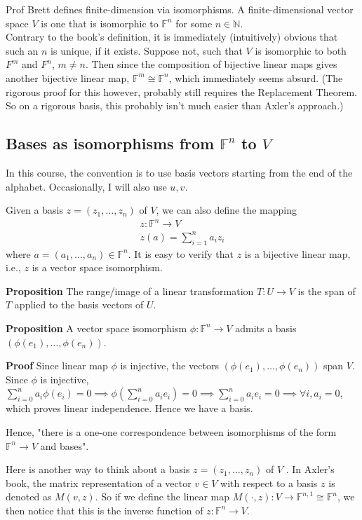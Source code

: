 \documentclass{article}
\begin{document}
Prof Brett defines finite-dimension via isomorphisms. A finite-dimensional vector space $V$ is one that is isomorphic to $\mathbb{F}^n$ for some $n\in \mathbb{N}$.\\
Contrary to the book's definition, it is immediately (intuitively) obvious that such an $n$ is unique, if it exists. Suppose not, such that $V$ is isomorphic to both $F^m$ and $F^n$, $m\neq n$. Then since the composition of bijective linear maps gives another bijective linear map, $\mathbb{F}^m\cong \mathbb{F}^n$, which immediately seems absurd. (The rigorous proof for this however, probably still requires the Replacement Theorem. So on a rigorous basis, this probably isn't much easier than Axler's approach.)


\subsection{Bases as isomorphisms from $\mathbb{F}^n$ to $V$}
In this course, the convention is to use basis vectors starting from the end of the alphabet. Occasionally, I will also use $u,v$.

Given a basis $z=(z_1,\dots,z_n)$ of $V$, we can also define the mapping 
\begin{align*}
z:\mathbb{F}^n\rightarrow V\\
z(a)=\sum_{i=1}^na_iz_i
\end{align*}
where $a=(a_1,\dots, a_n)\in \mathbb{F}^n$. It is easy to verify that $z$ is a bijective linear map, i.e., $z$ is a vector space isomorphism.

\textbf{Proposition} The range/image of a linear transformation $T:U\rightarrow V$ is the span of $T$ applied to the basis vectors of $U$.

\textbf{Proposition} A vector space isomorphism $\phi: \mathbb{F}^n\rightarrow V$ admits a basis $(\phi(e_1),\dots, \phi(e_n))$.

\textbf{Proof} Since linear map $\phi$ is injective, the vectors $(\phi(e_1),\dots, \phi(e_n))$ span $V$. Since $\phi$ is injective, $\sum_{i=0}^n a_i\phi(e_i)=0\implies \phi(\sum_{i=0}^n a_ie_i)=0 \implies \sum_{i=0}^n a_ie_i=0 \implies \forall i, a_i = 0$, which proves linear independence. Hence we have a basis.

Hence, "there is a one-one correspondence between isomorphisms of the form $\mathbb{F}^n\rightarrow V$ and bases".

Here is another way to think about a basis $z=(z_1,\dots,z_n)$ of $V$ . In Axler's book, the matrix representation of a vector $v\in V$ with respect to a basis $z$ is denoted as $M(v, z)$. So if we define the linear map $M(\cdot, z): V\rightarrow \mathbb{F}^{n,1}\cong \mathbb{F}^n$, we then notice that this is the inverse function of $z:\mathbb{F}^n\rightarrow V$.
\end{document}
